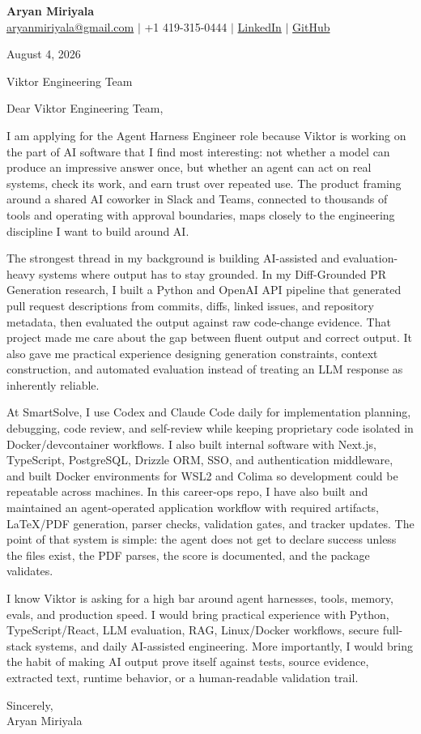 \documentclass[letterpaper,11pt]{article}
\begin{document}
{\Large\textbf{Aryan Miriyala}}\\
\href{mailto:aryanmiriyala@gmail.com}{aryanmiriyala@gmail.com} $|$ +1 419-315-0444 $|$
\href{https://www.linkedin.com/in/aryan-miriyala-7788a21b6/}{LinkedIn} $|$
\href{https://github.com/aryanmiriyala}{GitHub}

August 4, 2026

Viktor Engineering Team

Dear Viktor Engineering Team,

I am applying for the Agent Harness Engineer role because Viktor is working on the part of AI software that I find most interesting: not whether a model can produce an impressive answer once, but whether an agent can act on real systems, check its work, and earn trust over repeated use. The product framing around a shared AI coworker in Slack and Teams, connected to thousands of tools and operating with approval boundaries, maps closely to the engineering discipline I want to build around AI.

The strongest thread in my background is building AI-assisted and evaluation-heavy systems where output has to stay grounded. In my Diff-Grounded PR Generation research, I built a Python and OpenAI API pipeline that generated pull request descriptions from commits, diffs, linked issues, and repository metadata, then evaluated the output against raw code-change evidence. That project made me care about the gap between fluent output and correct output. It also gave me practical experience designing generation constraints, context construction, and automated evaluation instead of treating an LLM response as inherently reliable.

At SmartSolve, I use Codex and Claude Code daily for implementation planning, debugging, code review, and self-review while keeping proprietary code isolated in Docker/devcontainer workflows. I also built internal software with Next.js, TypeScript, PostgreSQL, Drizzle ORM, SSO, and authentication middleware, and built Docker environments for WSL2 and Colima so development could be repeatable across machines. In this career-ops repo, I have also built and maintained an agent-operated application workflow with required artifacts, LaTeX/PDF generation, parser checks, validation gates, and tracker updates. The point of that system is simple: the agent does not get to declare success unless the files exist, the PDF parses, the score is documented, and the package validates.

I know Viktor is asking for a high bar around agent harnesses, tools, memory, evals, and production speed. I would bring practical experience with Python, TypeScript/React, LLM evaluation, RAG, Linux/Docker workflows, secure full-stack systems, and daily AI-assisted engineering. More importantly, I would bring the habit of making AI output prove itself against tests, source evidence, extracted text, runtime behavior, or a human-readable validation trail.

Sincerely,\\
Aryan Miriyala
\end{document}
